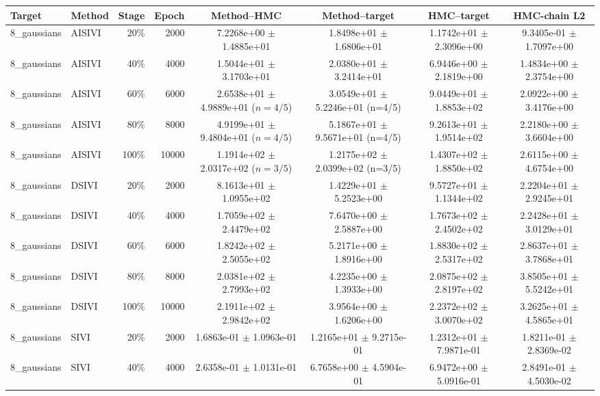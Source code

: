 \begin{tabular}{llrrcccc}
\toprule
Target & Method & Stage & Epoch & Method--HMC & Method--target & HMC--target & HMC-chain L2 \\
\midrule
8\_gaussians & AISIVI & 20\% & 2000 & 7.2268e+00 $\pm$ 1.4885e+01 & 1.8498e+01 $\pm$ 1.6806e+01 & 1.1742e+01 $\pm$ 2.3096e+00 & 9.3405e-01 $\pm$ 1.7097e+00 \\
8\_gaussians & AISIVI & 40\% & 4000 & 1.5044e+01 $\pm$ 3.1703e+01 & 2.0380e+01 $\pm$ 3.2414e+01 & 6.9446e+00 $\pm$ 2.1819e+00 & 1.4834e+00 $\pm$ 2.3754e+00 \\
8\_gaussians & AISIVI & 60\% & 6000 & 2.6538e+01 $\pm$ 4.9889e+01 ($n=4/5$) & 3.0549e+01 $\pm$ 5.2246e+01 (n=4/5) & 9.0449e+01 $\pm$ 1.8853e+02 & 2.0922e+00 $\pm$ 3.4176e+00 \\
8\_gaussians & AISIVI & 80\% & 8000 & 4.9199e+01 $\pm$ 9.4804e+01 ($n=4/5$) & 5.1867e+01 $\pm$ 9.5671e+01 (n=4/5) & 9.2613e+01 $\pm$ 1.9514e+02 & 2.2180e+00 $\pm$ 3.6604e+00 \\
8\_gaussians & AISIVI & 100\% & 10000 & 1.1914e+02 $\pm$ 2.0317e+02 ($n=3/5$) & 1.2175e+02 $\pm$ 2.0399e+02 (n=3/5) & 1.4307e+02 $\pm$ 1.8850e+02 & 2.6115e+00 $\pm$ 4.6754e+00 \\
8\_gaussians & DSIVI & 20\% & 2000 & 8.1613e+01 $\pm$ 1.0955e+02 & 1.4229e+01 $\pm$ 5.2523e+00 & 9.5727e+01 $\pm$ 1.1344e+02 & 2.2204e+01 $\pm$ 2.9245e+01 \\
8\_gaussians & DSIVI & 40\% & 4000 & 1.7059e+02 $\pm$ 2.4479e+02 & 7.6470e+00 $\pm$ 2.5887e+00 & 1.7673e+02 $\pm$ 2.4502e+02 & 2.2428e+01 $\pm$ 3.0129e+01 \\
8\_gaussians & DSIVI & 60\% & 6000 & 1.8242e+02 $\pm$ 2.5055e+02 & 5.2171e+00 $\pm$ 1.8916e+00 & 1.8830e+02 $\pm$ 2.5317e+02 & 2.8637e+01 $\pm$ 3.7868e+01 \\
8\_gaussians & DSIVI & 80\% & 8000 & 2.0381e+02 $\pm$ 2.7993e+02 & 4.2235e+00 $\pm$ 1.3933e+00 & 2.0875e+02 $\pm$ 2.8197e+02 & 3.8505e+01 $\pm$ 5.5242e+01 \\
8\_gaussians & DSIVI & 100\% & 10000 & 2.1911e+02 $\pm$ 2.9842e+02 & 3.9564e+00 $\pm$ 1.6206e+00 & 2.2372e+02 $\pm$ 3.0070e+02 & 3.2625e+01 $\pm$ 4.5865e+01 \\
8\_gaussians & SIVI & 20\% & 2000 & 1.6863e-01 $\pm$ 1.0963e-01 & 1.2165e+01 $\pm$ 9.2715e-01 & 1.2312e+01 $\pm$ 7.9871e-01 & 1.8211e-01 $\pm$ 2.8369e-02 \\
8\_gaussians & SIVI & 40\% & 4000 & 2.6358e-01 $\pm$ 1.0131e-01 & 6.7658e+00 $\pm$ 4.5904e-01 & 6.9472e+00 $\pm$ 5.0916e-01 & 2.8491e-01 $\pm$ 4.5030e-02 \\

\end{tabular}
